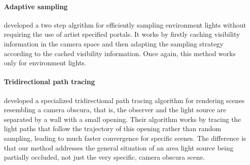 \documentclass[twocolumn]{article}
\begin{document}
\paragraph{Adaptive sampling}
\cite{atanasovAdaptiveEnvironmentSampling2018} developed a two step algrithm for efficiently sampling environment lights without requiring the use of artist specified portals. It works by firstly caching visibility information in the camera space and then adapting the sampling strategy according to the cached visibility information. Once again, this method works only for environment lights.

\paragraph*{Tridirectional path tracing}
\cite{andersonAetherEmbeddedDomain2017} developed a specialized tridirectional path tracing algorithm for rendering scenes resembling a camera obscura, that is, the observer and the light source are separated by a wall with a small opening. Their algorithm works by tracing the light paths that follow the trajectory of this opening rather than random sampling, leading to much faster convergence for specific scenes. The difference is that our method addresses the general situation of an area light source being partially occluded, not just the very specific, camera obscura scene. 



\printbibliography[heading=bibintoc, title={References}]
\end{document}
